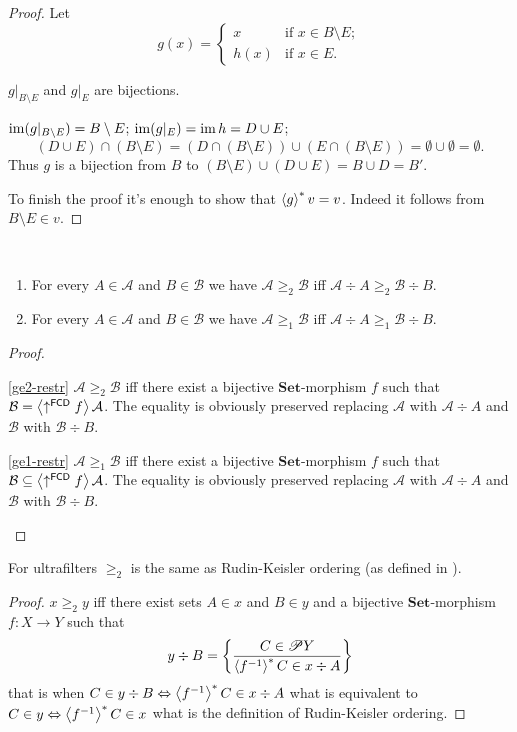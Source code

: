 \begin{proof}
Let
\[
g(x)=\begin{cases}
x & \text{if }x\in B\setminus E;\\
h(x) & \text{if }x\in E.
\end{cases}
\]


$g|_{B\setminus E}$ and $g|_{E}$ are bijections.

$\operatorname{im}(g|_{B\setminus E})=B\setminus E$; $\operatorname{im}(g|_{E})=\operatorname{im} h=D\cup E$;
\[
(D\cup E)\cap(B\setminus E)=(D\cap(B\setminus E))\cup(E\cap(B\setminus E))=\emptyset\cup\emptyset=\emptyset.
\]
Thus $g$ is a bijection from $B$ to $(B\setminus E)\cup(D\cup E)=B\cup D=B'$.

To finish the proof it's enough to show that $\left\langle g\right\rangle ^{\ast}v=v$. Indeed
it follows from $B\setminus E\in v$.\end{proof}
\begin{prop}
~
\begin{enumerate}
\item \label{ge2-restr}For every $A\in\mathcal{A}$ and $B\in\mathcal{B}$
we have $\mathcal{A}\ge_{2}\mathcal{B}$ iff $\mathcal{A}\div A\ge_{2}\mathcal{B}\div B$.
\item \label{ge1-restr}For every $A\in\mathcal{A}$ and $B\in\mathcal{B}$
we have $\mathcal{A}\ge_{1}\mathcal{B}$ iff $\mathcal{A}\div A\ge_{1}\mathcal{B}\div B$.
\end{enumerate}
\end{prop}
\begin{proof}
~
\begin{widedisorder}
\item [{\ref{ge2-restr}}] $\mathcal{A}\ge_{2}\mathcal{B}$ iff there exist
a bijective $\mathbf{Set}$-morphism $f$ such that $\mathcal{B}=\left\langle \uparrow^{\mathsf{FCD}}f\right\rangle\mathcal{A}$.
The equality is obviously preserved replacing $\mathcal{A}$ with
$\mathcal{A}\div A$ and $\mathcal{B}$ with $\mathcal{B}\div B$.
\item [{\ref{ge1-restr}}] $\mathcal{A}\ge_{1}\mathcal{B}$ iff there exist
a bijective $\mathbf{Set}$-morphism $f$ such that $\mathcal{B}\subseteq\left\langle \uparrow^{\mathsf{FCD}}f\right\rangle\mathcal{A}$.
The equality is obviously preserved replacing $\mathcal{A}$ with
$\mathcal{A}\div A$ and $\mathcal{B}$ with $\mathcal{B}\div B$.
\end{widedisorder}
\end{proof}
\begin{prop}
For ultrafilters $\ge_{2}$ is the same as Rudin-Keisler ordering
(as defined in \cite{comfort-ultra}).\end{prop}
\begin{proof}
$x\ge_{2}y$ iff there exist sets $A\in x$ and $B\in y$ and a bijective
$\mathbf{Set}$-morphism $f:X\rightarrow Y$ such that
\[
y\div B=\left\{ \frac{C\in\mathscr{P} Y}{\left\langle f^{-1}\right\rangle ^{\ast}C\in x\div A}\right\}
\]
 that is when $C\in y\div B\Leftrightarrow\left\langle f^{-1}\right\rangle ^{\ast}C\in x\div A$
what is equivalent to~$C\in y\Leftrightarrow\left\langle f^{-1}\right\rangle ^{\ast}C\in x$
what is the definition of Rudin-Keisler ordering.\end{proof}

